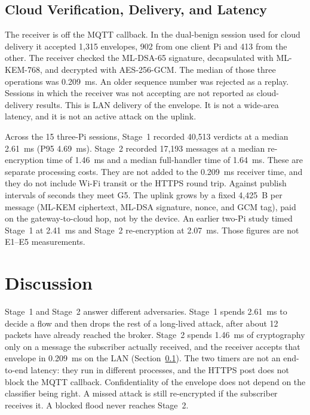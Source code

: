 \documentclass[journal]{IEEEtran}
\begin{document}
\subsection{Cloud Verification, Delivery, and Latency}
\label{sec:res-cloud}

The receiver is off the MQTT callback. In the dual-benign session used for cloud delivery it accepted 1,315 envelopes, 902 from one client Pi and 413 from the other. The receiver checked the ML-DSA-65 signature, decapsulated with ML-KEM-768, and decrypted with AES-256-GCM. The median of those three operations was 0.209~ms. An older sequence number was rejected as a replay. Sessions in which the receiver was not accepting are not reported as cloud-delivery results. This is LAN delivery of the envelope. It is not a wide-area latency, and it is not an active attack on the uplink.

Across the 15 three-Pi sessions, Stage~1 recorded 40,513 verdicts at a median 2.61~ms (P95 4.69~ms). Stage~2 recorded 17,193 messages at a median re-encryption time of 1.46~ms and a median full-handler time of 1.64~ms. These are separate processing costs. They are not added to the 0.209~ms receiver time, and they do not include Wi-Fi transit or the HTTPS round trip. Against publish intervals of seconds they meet G5. The uplink grows by a fixed 4,425~B per message (ML-KEM ciphertext, ML-DSA signature, nonce, and GCM tag), paid on the gateway-to-cloud hop, not by the device. An earlier two-Pi study timed Stage~1 at 2.41~ms and Stage~2 re-encryption at 2.07~ms. Those figures are not E1--E5 measurements.

\section{Discussion}
\label{sec:discussion}

Stage~1 and Stage~2 answer different adversaries. Stage~1 spends 2.61~ms to decide a flow and then drops the rest of a long-lived attack, after about 12 packets have already reached the broker. Stage~2 spends 1.46~ms of cryptography only on a message the subscriber actually received, and the receiver accepts that envelope in 0.209~ms on the LAN (Section~\ref{sec:res-cloud}). The two timers are not an end-to-end latency: they run in different processes, and the HTTPS post does not block the MQTT callback. Confidentiality of the envelope does not depend on the classifier being right. A missed attack is still re-encrypted if the subscriber receives it. A blocked flood never reaches Stage~2.
\end{document}
